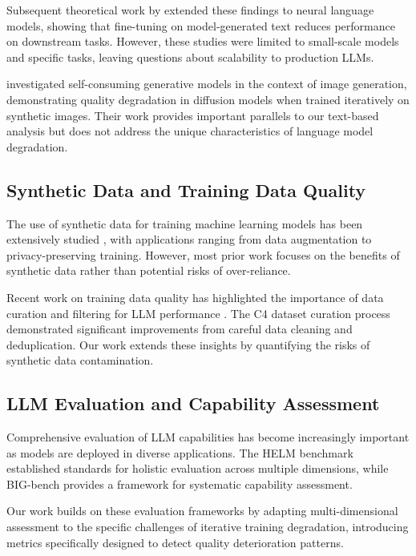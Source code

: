 \documentclass{article}
\begin{document}
Subsequent theoretical work by \cite{gerstgrasser2024train} extended these findings to neural language models, showing that fine-tuning on model-generated text reduces performance on downstream tasks. However, these studies were limited to small-scale models and specific tasks, leaving questions about scalability to production LLMs.

\cite{alemohammad2023self} investigated self-consuming generative models in the context of image generation, demonstrating quality degradation in diffusion models when trained iteratively on synthetic images. Their work provides important parallels to our text-based analysis but does not address the unique characteristics of language model degradation.

\subsection{Synthetic Data and Training Data Quality}

The use of synthetic data for training machine learning models has been extensively studied \cite{nikolenko2021synthetic}, with applications ranging from data augmentation to privacy-preserving training. However, most prior work focuses on the benefits of synthetic data rather than potential risks of over-reliance.

Recent work on training data quality has highlighted the importance of data curation and filtering for LLM performance \cite{wenzek2019ccnet}. The C4 dataset curation process demonstrated significant improvements from careful data cleaning and deduplication. Our work extends these insights by quantifying the risks of synthetic data contamination.

\subsection{LLM Evaluation and Capability Assessment}

Comprehensive evaluation of LLM capabilities has become increasingly important as models are deployed in diverse applications. The HELM benchmark \cite{liang2022holistic} established standards for holistic evaluation across multiple dimensions, while BIG-bench \cite{srivastava2022beyond} provides a framework for systematic capability assessment.

Our work builds on these evaluation frameworks by adapting multi-dimensional assessment to the specific challenges of iterative training degradation, introducing metrics specifically designed to detect quality deterioration patterns.
\end{document}
